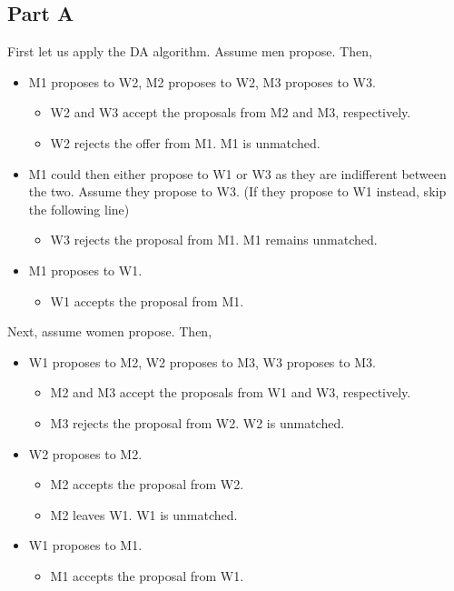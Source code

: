 \documentclass[11pt]{article} %
\begin{document}
\subsection{Part A}
First let us apply the DA algorithm. Assume men propose. Then,
\begin{itemize}
\item M1 proposes to W2, M2 proposes to W2, M3 proposes to W3.
\begin{itemize}
\item W2 and W3 accept the proposals from M2 and M3, respectively.
\item W2 rejects the offer from M1. M1 is unmatched.
\end{itemize}
\item M1 could then either propose to W1 or W3 as they are indifferent between the two. Assume they propose to W3. (If they propose to W1 instead, skip the following line)
 \begin{itemize}
\item W3 rejects the proposal from M1. M1 remains unmatched.
\end{itemize}
\item M1 proposes to W1.
\begin{itemize}
\item W1 accepts the proposal from M1.
\end{itemize}
\end{itemize}

Next, assume women propose. Then,
\begin{itemize}
\item W1 proposes to M2, W2 proposes to M3, W3 proposes to M3.
\begin{itemize}
\item M2 and M3 accept the proposals from W1 and W3, respectively.
\item M3 rejects the proposal from W2. W2 is unmatched.
\end{itemize}
\item W2 proposes to M2.
\begin{itemize}
\item M2 accepts the proposal from W2.
\item M2 leaves W1. W1 is unmatched.
\end{itemize}
\item W1 proposes to M1.
\begin{itemize}
\item M1 accepts the proposal from W1.
\end{itemize}
\end{itemize}
\end{document}
